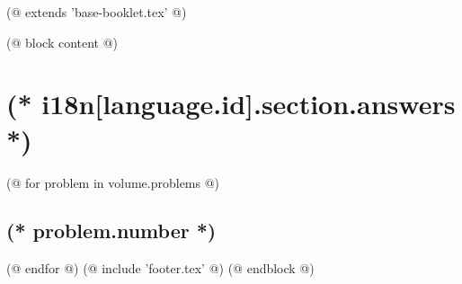 (@ extends 'base-booklet.tex' @)

(@ block content @)
    \section{(* i18n[language.id].section.answers *)}
    \pagestyle{answers}
    (@ for problem in volume.problems @)%
        \setcounter{volume}{(* volume.number *)}%
        \setcounter{problem}{(* problem.number *)}%
        \subsection{(* problem.number *)}%
    (@ endfor @)
    (@ include 'footer.tex' @)
(@ endblock @)

